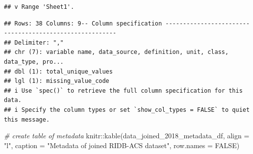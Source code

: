 \documentclass[
]{book}
\newenvironment{Shaded}{\begin{snugshade}}{\end{snugshade}}
\newcommand{\AttributeTok}[1]{\textcolor[rgb]{0.77,0.63,0.00}{#1}}
\newcommand{\CommentTok}[1]{\textcolor[rgb]{0.56,0.35,0.01}{\textit{#1}}}
\newcommand{\ConstantTok}[1]{\textcolor[rgb]{0.00,0.00,0.00}{#1}}
\newcommand{\FunctionTok}[1]{\textcolor[rgb]{0.00,0.00,0.00}{#1}}
\newcommand{\NormalTok}[1]{#1}
\newcommand{\SpecialCharTok}[1]{\textcolor[rgb]{0.00,0.00,0.00}{#1}}
\newcommand{\StringTok}[1]{\textcolor[rgb]{0.31,0.60,0.02}{#1}}
\begin{document}
\begin{verbatim}
## v Range 'Sheet1'.
\end{verbatim}

\begin{verbatim}
## Rows: 38 Columns: 9-- Column specification --------------------------------------------------------
## Delimiter: ","
## chr (7): variable name, data_source, definition, unit, class, data_type, pro...
## dbl (1): total_unique_values
## lgl (1): missing_value_code
## i Use `spec()` to retrieve the full column specification for this data.
## i Specify the column types or set `show_col_types = FALSE` to quiet this message.
\end{verbatim}

\begin{Shaded}
\begin{Highlighting}[]
\CommentTok{\# create table of metadata}
\NormalTok{knitr}\SpecialCharTok{::}\FunctionTok{kable}\NormalTok{(data\_joined\_2018\_metadata\_df,}
             \AttributeTok{align =} \StringTok{"l"}\NormalTok{,}
             \AttributeTok{caption =} \StringTok{"Metadata of joined RIDB{-}ACS dataset"}\NormalTok{,}
             \AttributeTok{row.names =} \ConstantTok{FALSE}\NormalTok{)}
\end{Highlighting}
\end{Shaded}
\end{document}
